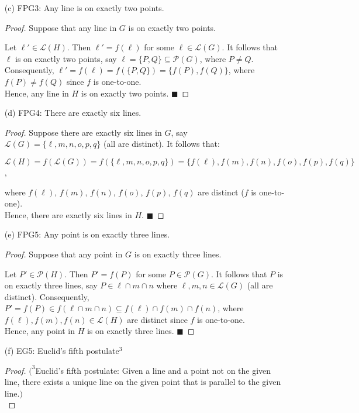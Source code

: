 \documentclass[a4paper, 10pt]{exam}
\begin{document}
\begin{questions}
\begin{enumerate}
        \item[(c)] FPG3: Any line is on exactly two points.
        \begin{proof}
            Suppose that any line in $G$ is on exactly two points.

            Let $\ell' \in \mathscr{L}(H)$. Then $\ell' = f(\ell)$ for some $\ell \in \mathscr{L}(G)$. It follows that $\ell$ is on exactly two points, say $\ell = \{P, Q\} \subseteq \mathscr{P}(G)$, where $P \neq Q$. Consequently, $\ell' = f(\ell) = f(\{P, Q\}) = \{f(P), f(Q)\}$, where $f(P) \neq f(Q)$ since $f$ is one-to-one. \\
    
            Hence, any line in $H$ is on exactly two points. $\blacksquare$
        \end{proof}
        
        \item[(d)] FPG4: There are exactly six lines.
        \begin{proof}
            Suppose there are exactly six lines in $G$, say $\mathscr{L}(G) = \{\ell, m, n, o, p, q\}$ (all are distinct). It follows that:
            \begin{center}
                $\mathscr{L}(H) = f(\mathscr{L}(G)) = f(\{\ell, m, n, o, p, q\}) = \{f(\ell), f(m), f(n), f(o), f(p), f(q)\} $, 
            \end{center}
            where $f(\ell)$, $f(m)$, $f(n)$, $f(o)$, $f(p)$, $f(q)$ are distinct ($f$ is one-to-one).\\
    
            Hence, there are exactly six lines in $H$. $\blacksquare$
        \end{proof}
        \item[(e)] FPG5: Any point is on exactly three lines.
        \begin{proof}
            Suppose that any point in $G$ is on exactly three lines.

            Let $P' \in \mathscr{P}(H)$. Then $P' = f(P)$ for some $P \in \mathscr{P}(G)$. It follows that $P$ is on exactly three lines, say $P \in \ell \cap m \cap n$ where $\ell, m, n \in \mathscr{L}(G)$ (all are distinct). Consequently, $P' = f(P) \in f(\ell \cap m \cap n) \subseteq f(\ell) \cap f(m) \cap f(n)$, where $f(\ell), f(m), f(n) \in \mathscr{L}(H)$ are distinct since $f$ is one-to-one. \\
    
            Hence, any point in $H$ is on exactly three lines. $\blacksquare$
        \end{proof}
        \item[(f)] EG5: Euclid’s fifth postulate$^3$
        \begin{proof}
        $(^3$Euclid’s fifth postulate: Given a line and a point not on the given line, there exists a unique line
on the given point that is parallel to the given line.$)$ \\


\end{proof}
\end{enumerate}
\end{questions}
\end{document}
